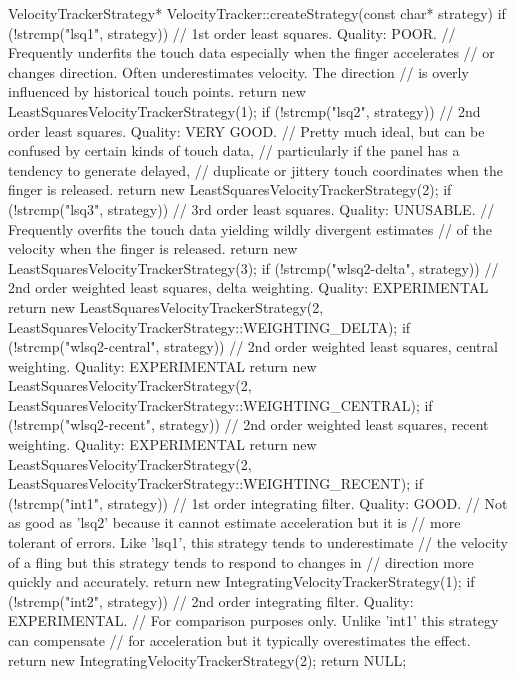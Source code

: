 VelocityTrackerStrategy* VelocityTracker::createStrategy(const char* strategy) {
    if (!strcmp("lsq1", strategy)) {
        // 1st order least squares.  Quality: POOR.
        // Frequently underfits the touch data especially when the finger accelerates
        // or changes direction.  Often underestimates velocity.  The direction
        // is overly influenced by historical touch points.
        return new LeastSquaresVelocityTrackerStrategy(1);
    }
    if (!strcmp("lsq2", strategy)) {
        // 2nd order least squares.  Quality: VERY GOOD.
        // Pretty much ideal, but can be confused by certain kinds of touch data,
        // particularly if the panel has a tendency to generate delayed,
        // duplicate or jittery touch coordinates when the finger is released.
        return new LeastSquaresVelocityTrackerStrategy(2);
    }
    if (!strcmp("lsq3", strategy)) {
        // 3rd order least squares.  Quality: UNUSABLE.
        // Frequently overfits the touch data yielding wildly divergent estimates
        // of the velocity when the finger is released.
        return new LeastSquaresVelocityTrackerStrategy(3);
    }
    if (!strcmp("wlsq2-delta", strategy)) {
        // 2nd order weighted least squares, delta weighting.  Quality: EXPERIMENTAL
        return new LeastSquaresVelocityTrackerStrategy(2,
                                                       LeastSquaresVelocityTrackerStrategy::WEIGHTING_DELTA);
    }
    if (!strcmp("wlsq2-central", strategy)) {
        // 2nd order weighted least squares, central weighting.  Quality: EXPERIMENTAL
        return new LeastSquaresVelocityTrackerStrategy(2,
                                                       LeastSquaresVelocityTrackerStrategy::WEIGHTING_CENTRAL);
    }
    if (!strcmp("wlsq2-recent", strategy)) {
        // 2nd order weighted least squares, recent weighting.  Quality: EXPERIMENTAL
        return new LeastSquaresVelocityTrackerStrategy(2,
                                                       LeastSquaresVelocityTrackerStrategy::WEIGHTING_RECENT);
    }
    if (!strcmp("int1", strategy)) {
        // 1st order integrating filter.  Quality: GOOD.
        // Not as good as 'lsq2' because it cannot estimate acceleration but it is
        // more tolerant of errors.  Like 'lsq1', this strategy tends to underestimate
        // the velocity of a fling but this strategy tends to respond to changes in
        // direction more quickly and accurately.
        return new IntegratingVelocityTrackerStrategy(1);
    }
    if (!strcmp("int2", strategy)) {
        // 2nd order integrating filter.  Quality: EXPERIMENTAL.
        // For comparison purposes only.  Unlike 'int1' this strategy can compensate
        // for acceleration but it typically overestimates the effect.
        return new IntegratingVelocityTrackerStrategy(2);
    }
    return NULL;
}

